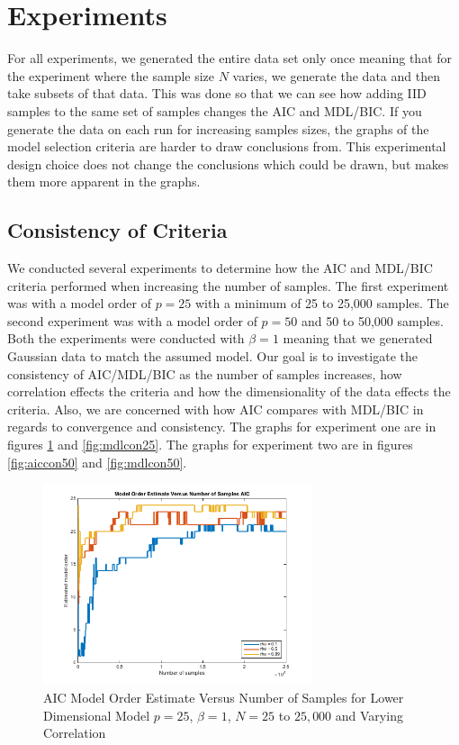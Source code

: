 \documentclass[journal]{IEEEtran}
\begin{document}
\section{Experiments}
\par For all experiments, we generated the entire data set only once meaning that for the experiment where the sample size \(N\) varies, we generate the data and then take subsets of that data. This was done so that we can see how adding IID samples to the same set of samples changes the AIC and MDL/BIC. If you generate the data on each run for increasing samples sizes, the graphs of the model selection criteria are harder to draw conclusions from. This experimental design choice does not change the conclusions which could be drawn, but makes them more apparent in the graphs.

\subsection{Consistency of Criteria}
\par We conducted several experiments to determine how the AIC and MDL/BIC criteria performed when increasing the number of samples. The first experiment was with a model order of \(p = 25\) with a minimum of 25 to 25,000 samples. The second experiment was with a model order of \(p = 50\) and 50 to 50,000 samples. Both the experiments were conducted with \(\beta = 1\) meaning that we generated Gaussian data to match the assumed model. Our goal is to investigate the consistency of AIC/MDL/BIC as the number of samples increases, how correlation effects the criteria and how the dimensionality of the data effects the criteria. Also, we are concerned with how AIC compares with MDL/BIC in regards to convergence and consistency. The graphs for experiment one are in figures \ref{fig:aiccon25} and \ref{fig:mdlcon25}. The graphs for experiment two are in figures \ref{fig:aiccon50} and \ref{fig:mdlcon50}.

\begin{figure}[h]
\centering
\includegraphics[width=3.1in]{../images/consistency_aic_rho_25.png}
\caption{AIC Model Order Estimate Versus Number of Samples for Lower Dimensional Model \(p = 25\), \(\beta = 1\), \(N = 25\) to \(25,000\) and Varying Correlation}
\label{fig:aiccon25}
\end{figure}
\end{document}
